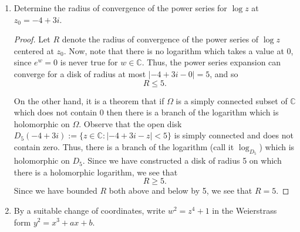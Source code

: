 \documentclass{article}
\begin{document}
\begin{enumerate}
\begin{proof}
		 We now turn our attention to the portion of the integral along the real axis.
		 \begin{align*}
		 \int_{[-R,R]} f(z) dz &= \int_{-R}^0 f(z) dz + \int_0^R f(z) dz\\
		 &= \int_{R}^0 f(-z) dz + \int_0^R f(z) dz\\
		 &= \int_R^0 \frac{(-z)^{1/5}}{1+(-z)^2} dz + \int_0^R f(z) dz \\
		 &= -\int_0^R \frac{(-z)^{1/5}}{1+z^2} dz + \int_0^R f(z) dz\\
		 &= - (-1)^{1/5} \int_0^R f(z) + \int_0^R f(z)dz\\
		 &=\left ( - (-1)^{1/5} + 1 \right ) \int_0^R f(z) dz \\
		 &=\left ( - e^{i\pi/5} + 1 \right ) \int_0^R f(z) dz 
		 \end{align*}
		 so taking $R \rightarrow \infty$ we see that 
		 \[ \pi i^{1/5} = \left (  1- e^{i\pi/5}  \right ) \int_0^\infty f(z) dz\]
		 or 
		 \[ \frac{\pi e^{\pi i/10}}{1- e^{i\pi/5} } = \int_0^\infty f(z) dz\]
	\end{proof}
	
	\item Determine the radius of convergence of the power series for $\log z$ at $z_0 = -4 + 3i$.
	
	\begin{proof}
		Let $R$ denote the radius of convergence of the power series of $\log z$ centered at $z_0$.
		Now, note that there is no logarithm which takes a value at $0$, since $e^w = 0$ is never true for $w \in \mathbb{C}$.
		Thus, the power series expansion can converge for a disk of radius at most $|-4+3i - 0| = 5$, and so 
		\[ R \leq 5.\]
		
		On the other hand, it is a theorem that if $\Omega$ is a simply connected subset of 
		$\mathbb{C}$ which does not contain $0$ then there is a branch of the logarithm which is holomorphic on $\Omega$. Observe that the open disk $D_{5}(-4+3i) := \{ z \in \mathbb{C} : |-4+3i - z | < 5\}$ is simply connected and does not contain zero. Thus, there is a branch of the logarithm (call it $\log_{D_5}$) which is holomorphic on $D_5$. Since we have constructed a disk of radius 5 on which there is a holomorphic logarithm, we see that 
		\[ R \geq 5.\]
		Since we have bounded $R$ both above and below by 5, we see that $R=5$.		
	\end{proof}
	
	\item By a suitable change of coordinates, write $w^2 = z^4+1$ in the Weierstrass form $y^2=x^3+ax+b$.
	

\end{enumerate}
\end{document}
